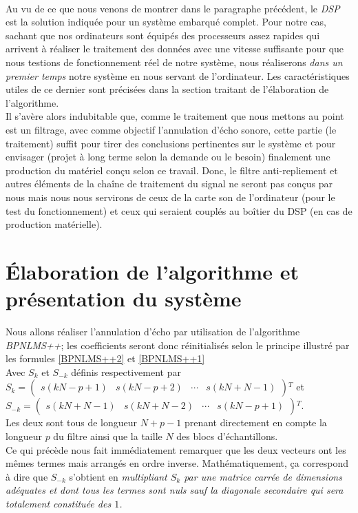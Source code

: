 \paragraph{}
Au vu de ce que nous venons de montrer dans le paragraphe précédent, le \emph{DSP} est la solution indiquée pour un système embarqué complet. Pour notre cas, sachant que nos ordinateurs sont équipés des processeurs assez rapides qui arrivent à réaliser le traitement des données avec une vitesse suffisante pour que nous testions de fonctionnement réel de notre système, nous réaliserons \emph{dans un premier temps} notre système en nous servant de l'ordinateur. Les caractéristiques utiles de ce dernier sont précisées dans la section traitant de l'élaboration de l'algorithme.\\
Il s'avère alors indubitable que, comme le traitement que nous mettons au point est un filtrage, avec comme objectif l'annulation d'écho sonore, cette partie (le traitement) suffit pour tirer des conclusions pertinentes sur le système et pour envisager (projet à long terme selon la demande ou le besoin) finalement une production du matériel conçu selon ce travail. Donc, le filtre anti-repliement et autres éléments de la chaîne de traitement du signal ne seront pas conçus par nous mais nous nous servirons de ceux de la carte son  de l'ordinateur (pour le test du fonctionnement) et ceux qui seraient couplés au boîtier du DSP (en cas de production matérielle).\\
\section{Élaboration de l'algorithme et présentation du système}
Nous allons réaliser l'annulation d'écho par utilisation de l'algorithme \emph{BPNLMS++}; les coefficients seront donc réinitialisés selon le principe illustré par les formules \ref{BPNLMS++2} et \ref{BPNLMS++1}\\
Avec $ S_{k} $ et $ S_{-k} $ définis respectivement par \\$ S_{k} = $\(\begin{pmatrix}
s(kN-p+1) & s(kN-p+2) & \cdots & s(kN+N-1)
\end{pmatrix}\)$ ^{T} $  et\\ $ S_{-k} = $\(\begin{pmatrix}
s(kN+N-1) & s(kN+N-2) & \cdots & s(kN-p+1)
\end{pmatrix}\)$ ^{T} $.\\
Les deux sont tous de longueur $ N+p-1 $ prenant directement en compte la longueur $ p $ du filtre ainsi que la taille $ N $ des blocs d'échantillons.\\
Ce qui précède nous fait immédiatement remarquer que les deux vecteurs ont les mêmes termes mais arrangés en ordre inverse. Mathématiquement, ça correspond à dire que $ S_{-k} $ s'obtient en \emph{multipliant $ S_{k} $ par une matrice carrée de dimensions adéquates et dont tous les termes sont nuls sauf la diagonale secondaire qui sera totalement constituée des $ 1 $.}\newpage
